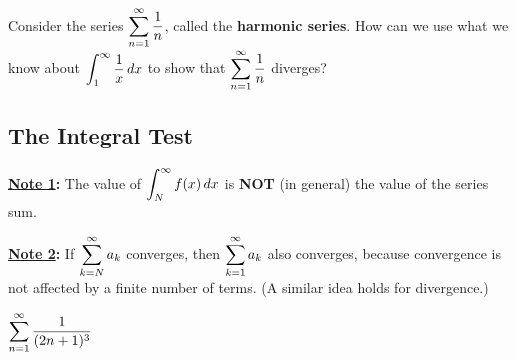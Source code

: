 \documentclass[12pt]{article}
\begin{document}
\Example Consider the series $\displaystyle\sum_{n=1}^\infty \dfrac{1}{n}$, called the \textbf{harmonic series}. How can we use what we know about $\displaystyle\int_1^\infty\frac{1}{x}\,dx$ to show that $\displaystyle\sum_{n=1}^\infty\dfrac{1}{n}$ diverges?

\vfill

\vfill

\newpage

\subsection*{The Integral Test}


\vspace{5mm}

\textbf{\underline{Note 1}:} The value of $\displaystyle\int_{N}^\infty f(x)\,dx$ is \textbf{NOT} (in general) the value of the series sum.

\vspace{3mm}

\textbf{\underline{Note 2}:} If $\displaystyle\sum_{k=N}^\infty a_k$ converges, then $\displaystyle\sum_{k=1}^\infty a_k$ also converges, because convergence is not affected by a finite number of terms. (A similar idea holds for divergence.)

\newpage

\Example $\displaystyle\sum_{n=1}^\infty \frac{1}{(2n+1)^3}$
\end{document}
